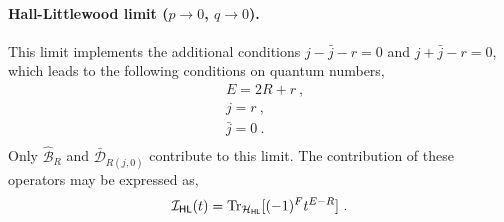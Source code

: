 \documentclass[a4paper,10pt]{article}
\newcommand{\mr}[1]{\mathsf{#1}}
\def\CI {{\cal I}}
\def\CI {{{\cal I}}}
\begin{document}
\begin{appendix}
\paragraph{Hall-Littlewood limit ($p\to 0$, $q\to 0$).} This limit implements the additional conditions $j-\bar{j}-r=0$ and $j+\bar{j}-r=0$, which leads to the following conditions on quantum numbers,
\begin{equation}
    \begin{split}
        &E=2R+r~, \\
        &j=r~, \\
        &\bar{j}=0~. \\
    \end{split}
\end{equation}
Only $\hat{\mathcal{B}}_R$ and $\bar{\mathcal{D}}_{R(j,0)}$ contribute to this limit. 
The contribution of these operators may be expressed as,
\begin{equation}
    \CI_{\mr{HL}}(t)=\text{Tr}_{\mathcal{H}_{\mr{HL}}}[(-1)^Ft^{E-R}]~.
\end{equation}


\end{appendix}
\end{document}
